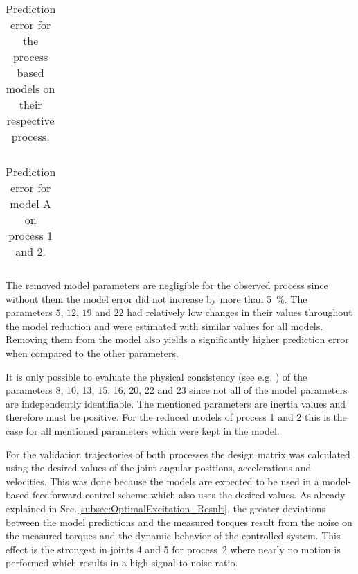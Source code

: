 \begin{table}[tb]
	\caption{Prediction error for the process based models on their respective process.}\label{tab:errorProcessOnProcess}
	\centering
	\begin{tabular}[h]{|r||c|c||c|c|}\hline
		
		\hline
	\end{tabular}
\end{table}

\begin{table}[tb]
	\caption{Prediction error for model A on process 1 and 2.}\label{tab:errorModelAOnProcess}
	\centering
	\begin{tabular}[h]{|r||c|c||c|c|}\hline
		
		\hline
	\end{tabular}
\end{table}

%		

The removed model parameters are negligible for the observed process since without them the model error did not increase by more than \SI{5}{\%}. The parameters $5$, $12$, $19$ and $22$ had relatively low changes in their values throughout the model reduction and were estimated with similar values for all models. Removing them from the model also yields a significantly higher prediction error when compared to the other parameters.

It is only possible to evaluate the physical consistency (see e.g. \cite{Gautier.2013}) of the parameters 8, 10, 13, 15, 16, 20, 22 and 23 since not all of the model parameters are independently identifiable. The mentioned parameters are inertia values and therefore must be positive. For the reduced models of process 1 and 2 this is the case for all mentioned parameters which were kept in the model.

For the validation trajectories of both processes the design matrix was calculated using the desired values of the joint angular positions, accelerations and velocities. This was done because the models are expected to be used in a model-based feedforward control scheme which also uses the desired values. As already explained in Sec.\,\ref{subsec:OptimalExcitation_Result}, the greater deviations between the model predictions and the measured torques result from the noise on the measured torques and the dynamic behavior of the controlled system. This effect is the strongest in joints 4 and 5 for process~2 where nearly no motion is performed which results in a high signal-to-noise ratio.

